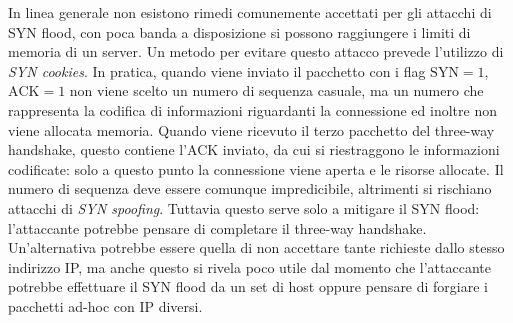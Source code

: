 In linea generale non esistono rimedi comunemente accettati per gli attacchi di SYN flood, con poca banda a disposizione si possono raggiungere i limiti di memoria di un server. Un metodo per evitare questo attacco prevede l'utilizzo di \textit{SYN cookies}. In pratica, quando viene inviato il pacchetto con i flag $\text{SYN}=1$, $\text{ACK}=1$ non viene scelto un numero di sequenza casuale, ma un numero che rappresenta la codifica di informazioni riguardanti la connessione ed inoltre non viene allocata memoria. Quando viene ricevuto il terzo pacchetto del three-way handshake, questo contiene l'ACK inviato, da cui si riestraggono le informazioni codificate: solo a questo punto la connessione viene aperta e le risorse allocate. Il numero di sequenza deve essere comunque impredicibile, altrimenti si rischiano attacchi di \textit{SYN spoofing}. Tuttavia questo serve solo a mitigare il SYN flood: l'attaccante potrebbe pensare di completare il three-way handshake. Un'alternativa potrebbe essere quella di non accettare tante richieste dallo stesso indirizzo IP, ma anche questo si rivela poco utile dal momento che l'attaccante potrebbe effettuare il SYN flood da un set di host oppure pensare di forgiare i pacchetti ad-hoc con IP diversi.\\

